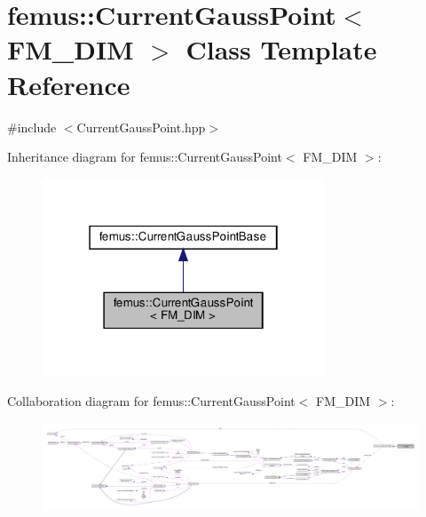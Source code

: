 \hypertarget{classfemus_1_1_current_gauss_point}{}\section{femus\+:\+:Current\+Gauss\+Point$<$ F\+M\+\_\+\+D\+IM $>$ Class Template Reference}
\label{classfemus_1_1_current_gauss_point}


{\ttfamily \#include $<$Current\+Gauss\+Point.\+hpp$>$}



Inheritance diagram for femus\+:\+:Current\+Gauss\+Point$<$ F\+M\+\_\+\+D\+IM $>$\+:
\nopagebreak
\begin{figure}[H]
\begin{center}
\leavevmode
\includegraphics[width=238pt]{classfemus_1_1_current_gauss_point__inherit__graph}
\end{center}
\end{figure}


Collaboration diagram for femus\+:\+:Current\+Gauss\+Point$<$ F\+M\+\_\+\+D\+IM $>$\+:
\nopagebreak
\begin{figure}[H]
\begin{center}
\leavevmode
\includegraphics[width=350pt]{classfemus_1_1_current_gauss_point__coll__graph}
\end{center}
\end{figure}
